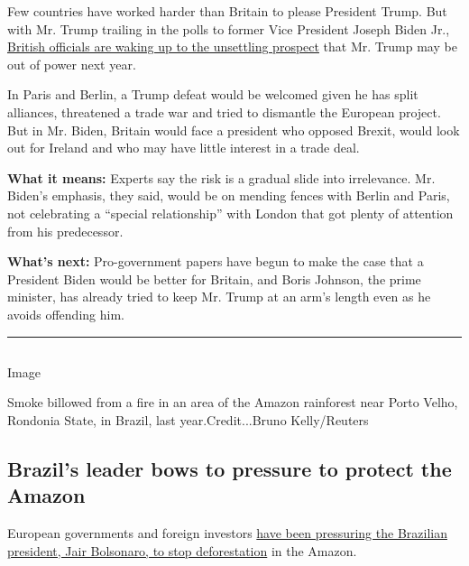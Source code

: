 Few countries have worked harder than Britain to please President Trump.
But with Mr. Trump trailing in the polls to former Vice President Joseph
Biden Jr.,
\href{https://www.nytimes3xbfgragh.onion/2020/07/31/world/europe/britain-biden-presidency-johnson.html}{British
officials are waking up to the unsettling prospect} that Mr. Trump may
be out of power next year.

In Paris and Berlin, a Trump defeat would be welcomed given he has split
alliances, threatened a trade war and tried to dismantle the European
project. But in Mr. Biden, Britain would face a president who opposed
Brexit, would look out for Ireland and who may have little interest in a
trade deal.

\textbf{What it means:} Experts say the risk is a gradual slide into
irrelevance. Mr. Biden's emphasis, they said, would be on mending fences
with Berlin and Paris, not celebrating a ``special relationship'' with
London that got plenty of attention from his predecessor.

\textbf{What's next:} Pro-government papers have begun to make the case
that a President Biden would be better for Britain, and Boris Johnson,
the prime minister, has already tried to keep Mr. Trump at an arm's
length even as he avoids offending him.

\begin{center}\rule{0.5\linewidth}{\linethickness}\end{center}

\hypertarget{-1}{%
\subsection{}\label{-1}}

Image

Smoke billowed from a fire in an area of the Amazon rainforest near
Porto Velho, Rondonia State, in Brazil, last year.Credit...Bruno
Kelly/Reuters

\hypertarget{brazils-leader-bows-to-pressure-to-protect-the-amazon}{%
\subsection{Brazil's leader bows to pressure to protect the
Amazon}\label{brazils-leader-bows-to-pressure-to-protect-the-amazon}}

European governments and foreign investors
\href{https://www.nytimes3xbfgragh.onion/2020/08/01/world/americas/Brazil-amazon-deforestation-bolsonaro.html?referringSource=articleShare}{have
been pressuring the Brazilian president, Jair Bolsonaro, to stop
deforestation} in the Amazon.

